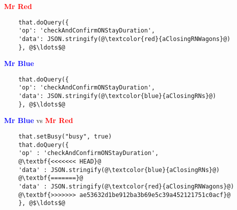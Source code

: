 \documentclass{memoir}
\begin{document}
    \textbf{\textcolor{red}{Mr Red}}
    \begin{verbatim}
    that.doQuery({
    'op': 'checkAndConfirmONStayDuration',
    'data': JSON.stringify(@\textcolor{red}{aClosingRNWagons}@)
    }, @$\ldots$@
    \end{verbatim}

    \vspace*{10pt}

    \textbf{\textcolor{blue}{Mr Blue}}
    \begin{verbatim}
    that.doQuery({
    'op': 'checkAndConfirmONStayDuration',
    'data': JSON.stringify(@\textcolor{blue}{aClosingRNs}@)
    }, @$\ldots$@
    \end{verbatim}

    \vspace*{10pt}

    \textbf{\textcolor{blue}{Mr Blue}} vs \textbf{\textcolor{red}{Mr Red}}
    \begin{verbatim}
    that.setBusy("busy", true)
    that.doQuery({
    'op' : 'checkAndConfirmONStayDuration',
    @\textbf{<<<<<<< HEAD}@
    'data' : JSON.stringify(@\textcolor{blue}{aClosingRNs}@)
    @\textbf{=======}@
    'data' : JSON.stringify(@\textcolor{red}{aClosingRNWagons}@)
    @\textbf{>>>>>>> ae53632d1be912ba3b69e5c39a452121751c0acf}@
    }, @$\ldots$@
    \end{verbatim}
\end{document}
